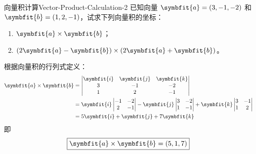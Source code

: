 \begin{problem}{向量积计算}{Vector-Product-Calculation-2}
    已知向量 $\symbfit{a} = (3, -1, -2)$ 和 $\symbfit{b} = (1, 2, -1)$，试求下列向量积的坐标：
    \begin{enumerate}
        \item $\symbfit{a} \times \symbfit{b}$；
        \item $(2\symbfit{a} - \symbfit{b}) \times (2\symbfit{a} + \symbfit{b})$。
    \end{enumerate}
\end{problem}

\begin{solution}

    根据向量积的行列式定义：
    \begin{equation}
        \begin{aligned}
            \symbfit{a} \times \symbfit{b} & = \begin{vmatrix} \symbfit{i} & \symbfit{j} & \symbfit{k} \\ 3 & -1 & -2 \\ 1 & 2 & -1 \end{vmatrix}                                                                                   \\
                                           & = \symbfit{i} \begin{vmatrix} -1 & -2 \\ 2 & -1 \end{vmatrix} - \symbfit{j} \begin{vmatrix} 3 & -2 \\ 1 & -1 \end{vmatrix} + \symbfit{k} \begin{vmatrix} 3 & -1 \\ 1 & 2 \end{vmatrix} \\
                                           & = 5\symbfit{i} + \symbfit{j} + 7\symbfit{k}
        \end{aligned}
    \end{equation}
    即
    \begin{equation}
        \boxed{\symbfit{a} \times \symbfit{b} = (5, 1, 7)}
    \end{equation}



\end{solution}

